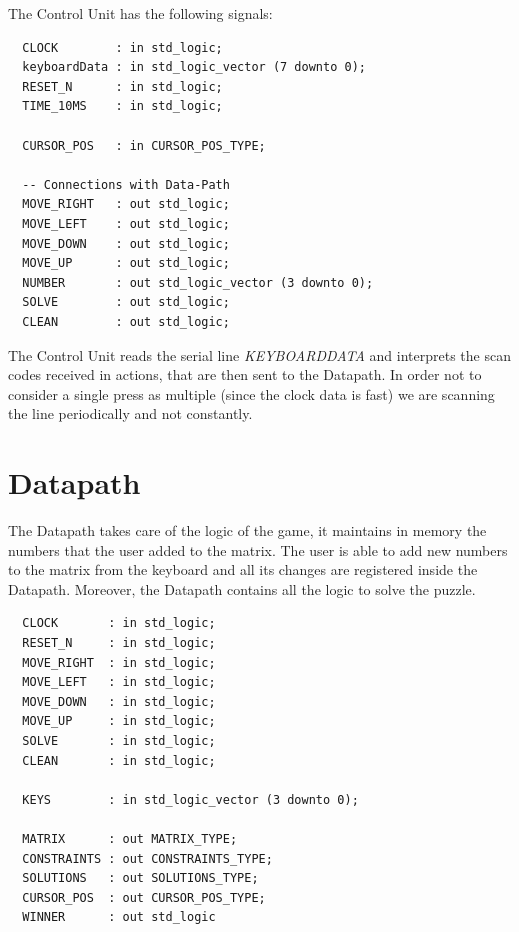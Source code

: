 \documentclass[12pt]{report}
\begin{document}
The Control Unit has the following signals:

\begin{center}
\begin{minipage}{0.5\textwidth}
\begin{verbatim}
  CLOCK        : in std_logic;
  keyboardData : in std_logic_vector (7 downto 0);
  RESET_N      : in std_logic;
  TIME_10MS    : in std_logic;

  CURSOR_POS   : in CURSOR_POS_TYPE;

  -- Connections with Data-Path
  MOVE_RIGHT   : out std_logic;
  MOVE_LEFT    : out std_logic;
  MOVE_DOWN    : out std_logic;
  MOVE_UP      : out std_logic;
  NUMBER       : out std_logic_vector (3 downto 0);
  SOLVE        : out std_logic;
  CLEAN        : out std_logic;
\end{verbatim}
\end{minipage}
\end{center}

The Control Unit reads the serial line \textit{KEYBOARDDATA} and
interprets the scan codes received in actions, that are then sent to the
Datapath. In order not to consider a single press as multiple (since the
clock data is fast) we are scanning the line periodically and not
constantly.

\newpage

\section*{Datapath}

The Datapath takes care of the logic of the game, it maintains in memory
the numbers that the user added to the matrix. The user is able to add new
numbers to the matrix from the keyboard and all its changes are registered
inside the Datapath. Moreover, the Datapath contains all the logic to
solve the puzzle.

\begin{center}
\begin{minipage}{0.5\textwidth}
\begin{verbatim}
  CLOCK       : in std_logic;
  RESET_N     : in std_logic;
  MOVE_RIGHT  : in std_logic;
  MOVE_LEFT   : in std_logic;
  MOVE_DOWN   : in std_logic;
  MOVE_UP     : in std_logic;
  SOLVE       : in std_logic;
  CLEAN       : in std_logic;

  KEYS        : in std_logic_vector (3 downto 0);

  MATRIX      : out MATRIX_TYPE;
  CONSTRAINTS : out CONSTRAINTS_TYPE;
  SOLUTIONS   : out SOLUTIONS_TYPE;
  CURSOR_POS  : out CURSOR_POS_TYPE;
  WINNER      : out std_logic
\end{verbatim}
\end{minipage}
\end{center}
\end{document}
